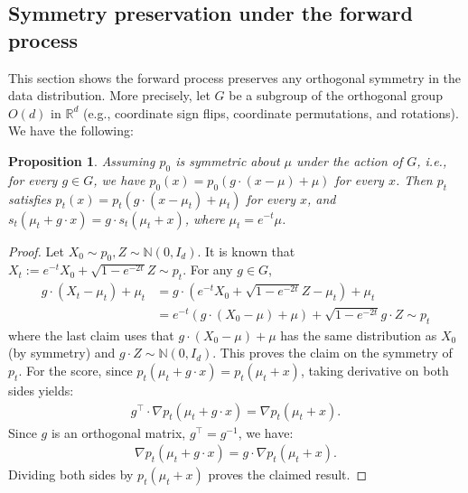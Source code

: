 \documentclass[12pt]{article}
\newcommand{\0}{\mathbf{0}}
\newtheorem{prop}{Proposition}
\begin{document}
\subsection{Symmetry preservation under the forward process}\label{subsec: symmetry preservation}
This section shows the forward process preserves any orthogonal symmetry in the data distribution. More precisely, let $G$ be a subgroup of the orthogonal group $O(d)$ in $\mathbb R^d$ (e.g., coordinate sign flips, coordinate permutations, and rotations). We have the following:

\begin{prop}\label{prop: G-symmetry}
Assuming $p_0$ is symmetric about $\mu$ under the action of $G$, i.e., for every $g\in G$, we have $p_0(x) = p_0(g\cdot (x-\mu) + \mu)$ for every $x$. Then $p_t$  satisfies $p_t(x) = p_t(g\cdot (x-\mu_t) + \mu_t)$ for every $x$, and $s_t(\mu_t+ g \cdot x) = g\cdot s_t(\mu_t+x)$, where $\mu_t = e^{-t}\mu$.
    
\end{prop}

\begin{proof}
    Let $X_0 \sim p_0, Z\sim \mathbb N(0, I_d)$. It is known that $X_t := e^{-t}X_0 + \sqrt{1 - e^{-2t}} Z \sim p_t$. For any $g\in G$, 
    \begin{align*}
        g\cdot (X_t -\mu_t) + \mu_t &= g\cdot (e^{-t}X_0 + \sqrt{1 - e^{-2t}} Z - \mu_t) + \mu_t \\
        & = e^{-t} (g\cdot (X_0 - \mu) + \mu) + \sqrt{1 - e^{-2t}} g\cdot Z \sim p_t
    \end{align*}
    where the last claim uses that $g\cdot (X_0 - \mu) + \mu$ has the same distribution as $X_0$ (by symmetry) and $g\cdot Z \sim \mathbb N(0,I_d)$. This proves the claim on the symmetry of $p_t$.
    For the score, since $p_t(\mu_t + g\cdot x ) = p_t(\mu_t + x)$, taking derivative on both sides yields:
    \begin{align*}
        g^\top \cdot \nabla p_t(\mu_t + g\cdot x) = \nabla p_t(\mu_t + x).
    \end{align*}
    Since $g$ is an orthogonal matrix, $g^\top = g^{-1}$, we have:
    \begin{align*}
        \nabla p_t(\mu_t + g\cdot x) = g\cdot \nabla p_t(\mu_t + x).
    \end{align*}
    Dividing both sides by $p_t(\mu_t + x)$ proves the claimed result.
\end{proof}
\end{document}
